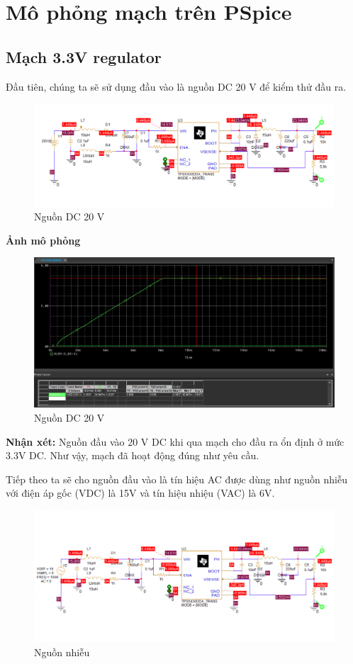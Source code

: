 \section{Mô phỏng mạch trên PSpice}
\subsection{Mạch 3.3V regulator}
Đầu tiên, chúng ta sẽ sử dụng đầu vào là nguồn DC 20 V để kiểm thử đầu ra.

\begin{figure}[ht]
    \centering
    \includegraphics[width=1\textwidth]{graphics/section4/f1.png}
    \caption{Nguồn DC 20 V}
\end{figure}

\textbf{Ảnh mô phỏng}
\begin{figure}[ht]
    \centering
    \includegraphics[width=1\textwidth]{graphics/section4/f2.png}
    \caption{Nguồn DC 20 V}
\end{figure}

\textbf{Nhận xét: }Nguồn đầu vào 20 V DC khi qua mạch cho đầu ra ổn định ở mức 3.3V DC. Như vậy, mạch đã hoạt động đúng như yêu cầu.

Tiếp theo ta sẽ cho nguồn đầu vào là tín hiệu AC được dùng như nguồn nhiễu với điện áp gốc (VDC) là 15V và tín hiệu nhiệu (VAC) là 6V.

\begin{figure}[ht]
    \centering
    \includegraphics[width=1\textwidth]{graphics/section4/f3.png}
    \caption{Nguồn nhiễu}
\end{figure}

